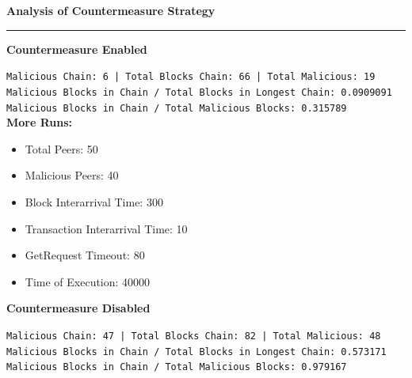 \documentclass[a4paper,12pt]{article}
\newenvironment{solution}[2][]{%
\begin{mdframed}[linecolor=blue!70!black, linewidth=2pt, roundcorner=10pt, backgroundcolor=yellow!10!white, skipabove=12pt, skipbelow=12pt]%
	\textbf{\large #2}
	\par\noindent\rule{\textwidth}{0.4pt}
}{
\end{mdframed}
}
\begin{document}
\begin{solution}{Analysis of Countermeasure Strategy}
\textbf{Countermeasure Enabled}
\vspace{0pt}
\begin{figure}[H]
\centering
{} 

\end{figure}
\vspace{-15pt}
\texttt{Malicious Chain: 6 |
Total Blocks Chain: 66 |
Total Malicious: 19 \\
Malicious Blocks in Chain / Total Blocks in Longest Chain: 0.0909091\\
Malicious Blocks in Chain / Total Malicious Blocks: 0.315789}\\

\textbf{More Runs:}
\begin{itemize}
	\vspace{-7pt}
	\item Total Peers: 50
	\vspace{-7pt}
	\item Malicious Peers: 40
	\vspace{-7pt}
	\item Block Interarrival Time: 300
	\vspace{-7pt}
	\item Transaction Interarrival Time: 10
	\vspace{-7pt}
	\item GetRequest Timeout: 80 
	\vspace{-7pt}
	\item Time of Execution: 40000
\end{itemize}



\textbf{Countermeasure Disabled}
\begin{figure}[H]
\centering
{} 

\end{figure}
\vspace{-15pt}
\texttt{Malicious Chain: 47 |
Total Blocks Chain: 82 |
Total Malicious: 48\\
Malicious Blocks in Chain / Total Blocks in Longest Chain: 0.573171\\
Malicious Blocks in Chain / Total Malicious Blocks: 0.979167}\\


\end{solution}
\end{document}
